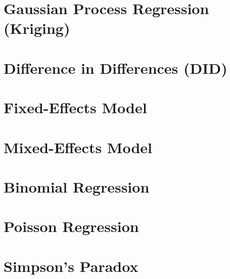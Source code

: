 \section{Gaussian Process Regression (Kriging)}
\label{regression:kriging}


\section{Difference in Differences (DID)}
\label{regression:DID}

\section{Fixed-Effects Model}
\label{regression:fixed_effects}

\section{Mixed-Effects Model}
\label{regression:mixed_effects}

\section{Binomial Regression}
\label{regression:binomial}

\section{Poisson Regression}
\label{regression:poisson}

\section{Simpson's Paradox}
\label{regression:simpsons_paradox}
